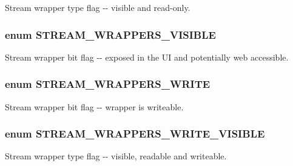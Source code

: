 \label{stream__wrappers_8inc_a2efceeff10f6144584b131d04f87afcc}
Stream wrapper type flag -\/-\/ visible and read-\/only. \hypertarget{stream__wrappers_8inc_a353d633ead3baf499548817365879c3d}{
\subsubsection[{STREAM\_\-WRAPPERS\_\-VISIBLE}]{\setlength{\rightskip}{0pt plus 5cm}enum {\bf STREAM\_\-WRAPPERS\_\-VISIBLE}}}
\label{stream__wrappers_8inc_a353d633ead3baf499548817365879c3d}
Stream wrapper bit flag -\/-\/ exposed in the UI and potentially web accessible. \hypertarget{stream__wrappers_8inc_ade674b37b69a2408df3995d697672c87}{
\subsubsection[{STREAM\_\-WRAPPERS\_\-WRITE}]{\setlength{\rightskip}{0pt plus 5cm}enum {\bf STREAM\_\-WRAPPERS\_\-WRITE}}}
\label{stream__wrappers_8inc_ade674b37b69a2408df3995d697672c87}
Stream wrapper bit flag -\/-\/ wrapper is writeable. \hypertarget{stream__wrappers_8inc_af9258db142c2bc34a37fb4797367e30f}{
\subsubsection[{STREAM\_\-WRAPPERS\_\-WRITE\_\-VISIBLE}]{\setlength{\rightskip}{0pt plus 5cm}enum {\bf STREAM\_\-WRAPPERS\_\-WRITE\_\-VISIBLE}}}
\label{stream__wrappers_8inc_af9258db142c2bc34a37fb4797367e30f}
Stream wrapper type flag -\/-\/ visible, readable and writeable. 